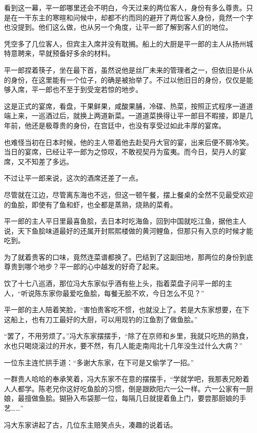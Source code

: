 看到这一幕，平一郎哪里还会不明白，今天过来的两位客人，身份有多么尊贵。只是在一干东主的寒暄和问候中，却都不约而同的避开了两位客人身份，竟然一个字也没提到。他们这么做，也从另一个角度，让平一郎了解到客人们的地位。

凭空多了几位客人，但宾主入席并没有耽搁。船上的大厨是平一郎的主人从扬州城特意聘来，早就预备好多余的材料。

平一郎捏着筷子，坐在最下首，虽然说他是丝厂未来的管理者之一，但依旧是仆从的身份，在这里能有一个位子，的确是被抬举了。不过以他旧日的身份，仅仅是能够入席，平一郎也不至于到受宠若惊的地步。

这是正式的宴席，看盘，干果鲜果，咸酸果脯，冷碟、热菜，按照正式程序一道道端上来，一巡酒过后，就换上两道新菜。一道道菜换得让平一郎目不暇接，即是几年前，他还是极尊贵的身份，在宫廷中，也没有享受过如此丰厚的宴席。

也难怪当初在日本时候，他的主人带着他去赴契丹大官的宴，出来后便不屑冷笑。当日的宴席，已经让平一郎为之惊叹，不敢视契丹为蛮夷。而今日，契丹人的宴席，又不知差了多远。

不过让平一郎来说，这次的酒席还差了一点。

尽管就在江边，尽管离东海也不远，但这一顿午餐，摆上餐桌的全然不见最受欢迎的鱼脍，即使有了鱼和虾，也全都是蒸熟，烧熟的菜肴。

平一郎的主人平日里最喜鱼脍，去日本时吃海鱼，回到中国就吃江鱼，据他主人说，天下鱼脍味道最好的还属开封熙熙楼做的黄河鲤鱼，但那只有入京的时候才能吃到。

为了就着贵客的口味，竟然连菜谱都换了。巴结到了这副田地，那两位的身份到底尊贵到哪个地步？平一郎的心中越发的好奇了起来。

饮了十七八巡酒，那位冯大东家似乎酒有些上头，指着菜盘子问平一郎的主人，“听说陈东家你最爱吃鱼脍，每餐无脍不欢，今日怎么不见？”

平一郎的主人陪着笑脸，“害怕贵客吃不惯，也就没上了。若是大东家想要，在下这船上，也有刀工最好的大厨，可以用现钓的江鱼割了做鱼脍。”

“罢了，不用劳烦了。”冯大东家摆摆手，“除了在京师和乡里，我就只吃热的熟食，水也只喝烧滚过的开水，要不然，有几人能走南闯北十几年没生过什么大病？”

一位东主连忙拱手道：“多谢大东家，在下可是又偷学了一招。”

一群贵人哈哈的奉承笑着，冯大东家不在意的摆摆手，“学就学吧，我那表兄盼着人人都学。陈老兄你这好吃鱼脍的习惯，倒是跟欧阳六一公一样。六一公家有一厨娘，最擅做鱼脍。猢狲入布袋那一位，每隔几日就提着鱼上门，要尝那厨娘的手艺……”

冯大东家讲起了古，几位东主赔笑点头，凑趣的说着话。


